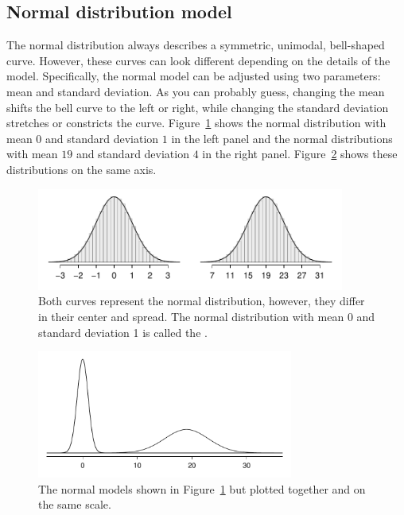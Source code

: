 \subsection{Normal distribution model}
\label{NormalDistributionModelSubsection}

The normal distribution always describes a symmetric, unimodal, bell-shaped curve. However, these curves can look different depending on the details of the model. Specifically, the normal model can be adjusted using two parameters: mean and standard deviation. As you can probably guess, changing the mean shifts the bell curve to the left or right, while changing the standard deviation stretches or constricts the curve. Figure~\ref{twoSampleNormals} shows the normal distribution with mean $0$ and standard deviation $1$ in the left panel and the normal distributions with mean $19$ and standard deviation $4$ in the right panel. Figure~\ref{twoSampleNormalsStacked} shows these distributions on the same axis.

\begin{figure}[hht]
\centering
\includegraphics[width=0.9\textwidth]{02/figures/twoSampleNormals/twoSampleNormals}
\caption{Both curves represent the normal distribution, however, they differ in their center and spread. The normal distribution with mean 0 and standard deviation 1 is called the .}
\label{twoSampleNormals}
\end{figure}

\begin{figure}[hht]
\centering
\includegraphics[width=0.75\textwidth]{02/figures/twoSampleNormalsStacked/twoSampleNormalsStacked}
\caption{The normal models shown in Figure~\ref{twoSampleNormals} but plotted together and on the same scale.}
\label{twoSampleNormalsStacked}
\end{figure}

